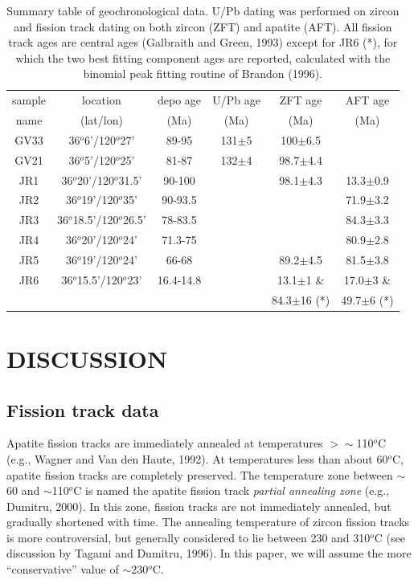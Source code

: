 \documentclass[11pt,twoside]{article}
\begin{document}
\begin{table}[htbp]
  \centering
\begin{tabular}{c|ccccc}
sample & location & depo age & U/Pb age & ZFT age & AFT age\\
name & (lat/lon) & (Ma) & (Ma) & (Ma) & (Ma)\\
\hline
      GV33 & 36$^o$6'/120$^o$27' & 89-95 & 131$\pm$5 &  100$\pm$6.5 & \\
      GV21 & 36$^o$5'/120$^o$25' & 81-87 & 132$\pm$4 & 98.7$\pm$4.4 & \\
       JR1 & 36$^o$20'/120$^o$31.5' & 90-100 & & 98.1$\pm$4.3 & 13.3$\pm$0.9 \\
       JR2 & 36$^o$19'/120$^o$35' & 90-93.5 & & & 71.9$\pm$3.2 \\
       JR3 & 36$^o$18.5'/120$^o$26.5' & 78-83.5 & & & 84.3$\pm$3.3 \\
       JR4 & 36$^o$20'/120$^o$24' & 71.3-75 & & & 80.9$\pm$2.8 \\
       JR5 & 36$^o$19'/120$^o$24' & 66-68 & & 89.2$\pm$4.5 & 81.5$\pm$3.8 \\
       JR6 & 36$^o$15.5'/120$^o$23' & 16.4-14.8 & & 13.1$\pm$1 \& & 17.0$\pm$3 \& \\
           & & & & 84.3$\pm$16 (*) & 49.7$\pm$6 (*) \\
\end{tabular}
  \caption{
Summary table  of geochronological data. U/Pb dating  was performed on
zircon  and fission  track dating  on  both zircon  (ZFT) and  apatite
(AFT). All fission  track ages are central ages  (Galbraith and Green,
1993) except for  JR6 (*),  for which the  two best  fitting component
ages are  reported, calculated with the binomial  peak fitting routine
of Brandon (1996).}
  \label{tab:summary}
\end{table}

\section*{\uppercase{Discussion}}

\subsection*{Fission track data}
\label{sec:FT}

Apatite  fission  tracks  are  immediately  annealed  at  temperatures
$>\sim$110$^o$C  (e.g.,   Wagner  and   Van  den  Haute,   1992).   At
temperatures  less  than about  60$^o$C,  apatite  fission tracks  are
completely  preserved.   The  temperature  zone between  $\sim$60  and
$\sim$110$^o$C  is  named  the  apatite  fission  track  {\it  partial
annealing zone}  (e.g., Dumitru, 2000).  In this  zone, fission tracks
are not  immediately annealed, but gradually shortened  with time. The
annealing temperature of zircon  fission tracks is more controversial,
but  generally  considered  to  lie  between  230  and  310$^o$C  (see
discussion by Tagami and Dumitru, 1996). In this paper, we will assume
the more ``conservative'' value of $\sim$230$^o$C.\\
\end{document}
